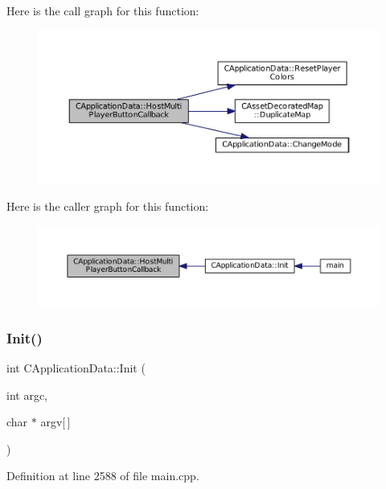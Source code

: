 Here is the call graph for this function\+:
\nopagebreak
\begin{figure}[H]
\begin{center}
\leavevmode
\includegraphics[width=350pt]{classCApplicationData_a9f804f7f34e1f0abf8c395cd0032d811_cgraph}
\end{center}
\end{figure}
Here is the caller graph for this function\+:
\nopagebreak
\begin{figure}[H]
\begin{center}
\leavevmode
\includegraphics[width=350pt]{classCApplicationData_a9f804f7f34e1f0abf8c395cd0032d811_icgraph}
\end{center}
\end{figure}
\hypertarget{classCApplicationData_ab757e7ad037decb18cefa3f4ad2e1298}{}\label{classCApplicationData_ab757e7ad037decb18cefa3f4ad2e1298} 
\subsubsection{\texorpdfstring{Init()}{Init()}}
{\footnotesize\ttfamily int C\+Application\+Data\+::\+Init (\begin{DoxyParamCaption}\item[{int}]{argc,  }\item[{char $\ast$}]{argv\mbox{[}$\,$\mbox{]} }\end{DoxyParamCaption})}



Definition at line 2588 of file main.\+cpp.


